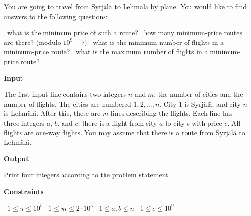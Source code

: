 You are going to travel from Syrjälä to Lehmälä by plane. You would like to find answers to the following questions:

\textbullet\ what is the minimum price of such a route?
\textbullet\ how many minimum-price routes are there? (modulo $10^9+7)$
\textbullet\ what is the minimum number of flights in a minimum-price route?
\textbullet\ what is the maximum number of flights in a minimum-price route?

\vspace{0.3cm}\noindent\textbf{Input}

The first input line contains two integers $n$ and $m$: the number of cities and the number of flights. The cities are numbered $1,2,\ldots,n$. City 1 is Syrjälä, and city $n$ is Lehmälä.
After this, there are $m$ lines describing the flights. Each line has three integers $a$, $b$, and $c$: there is a flight from city $a$ to city $b$ with price $c$. All flights are one-way flights.
You may assume that there is a route from Syrjälä to Lehmälä.

\vspace{0.3cm}\noindent\textbf{Output}

Print four integers according to the problem statement.

\vspace{0.3cm}\noindent\textbf{Constraints}

\textbullet\ $1 \le n \le 10^5$
\textbullet\ $1 \le m \le 2 \cdot 10^5$
\textbullet\ $1 \le a,b \le n$
\textbullet\ $1 \le c \le 10^9$